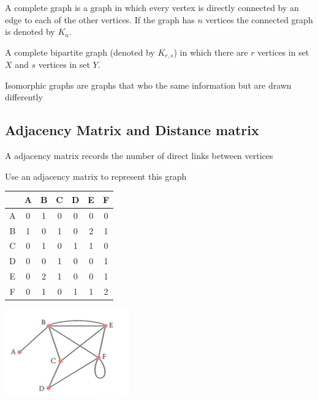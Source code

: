 \documentclass[a4paper]{article}
\begin{document}
\newpage

\begin{defi}
	A complete graph is a graph in which every vertex is directly connected by an edge to each of the other vertices. If the graph has $n$ vertices the connected graph is denoted by $K_n$.
\end{defi}


\begin{defi}
	A complete bipartite graph (denoted by $K_{r,s}$) in which there are $r$ vertices in set $X$ and $s$ vertices in set $Y$.
\end{defi}


\begin{defi}
	Isomorphic graphs are graphs that who the same information but are drawn differently
\end{defi}

\subsection{Adjacency Matrix and Distance matrix}
\begin{defi}
	A adjacency matrix records the number of direct links between vertices
\end{defi}

\begin{eg}
	Use an adjacency matrix to represent this graph\\

	\begin{tabular}{c|cccccc}
		  & A & B & C & D & E & F \\
		\hline
		A & 0 & 1 & 0 & 0 & 0 & 0 \\
		B & 1 & 0 & 1 & 0 & 2 & 1 \\
		C & 0 & 1 & 0 & 1 & 1 & 0 \\
		D & 0 & 0 & 1 & 0 & 0 & 1 \\
		E & 0 & 2 & 1 & 0 & 0 & 1 \\
		F & 0 & 1 & 0 & 1 & 1 & 2 \\
	\end{tabular}
	\includegraphics{img_D/2_2ex1}
\end{eg}
\end{document}
